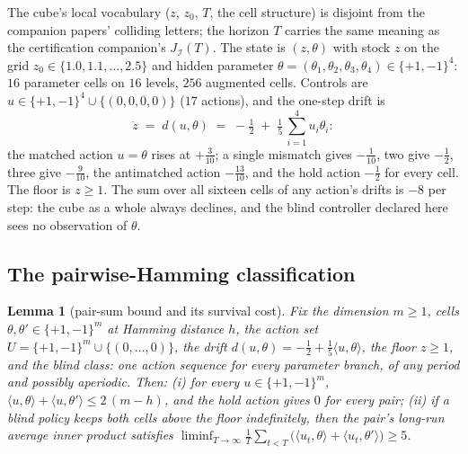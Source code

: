 \documentclass[10pt,twocolumn]{article}
\theoremstyle{plain}
\newtheorem{lemma}[theorem]{Lemma}
\theoremstyle{definition}
\theoremstyle{remark}
\begin{document}
The cube's local vocabulary (\(z\), \(z_{0}\), \(T\), the cell
structure) is disjoint from the companion papers' colliding letters;
the horizon \(T\) carries the same meaning as the certification
companion's \(J_{\mathcal{I}}(T)\). The state is \((z, \theta)\) with stock \(z\) on the grid
\(z_{0} \in \{1.0, 1.1, \dots, 2.5\}\) and hidden parameter
\(\theta = (\theta_{1}, \theta_{2}, \theta_{3}, \theta_{4}) \in
\{+1, -1\}^{4}\): \(16\) parameter cells on \(16\) levels, \(256\)
augmented cells. Controls are \(u \in \{+1,-1\}^{4} \cup \{(0,0,0,0)\}\)
(\(17\) actions), and the one-step drift is
\[
\dot z \;=\; d(u, \theta) \;=\; -\tfrac12
\;+\; \tfrac15\,\textstyle\sum_{i=1}^{4} u_{i}\theta_{i}:
\]
the matched action \(u = \theta\) rises at \(+\tfrac3{10}\); a single
mismatch gives \(-\tfrac1{10}\), two give \(-\tfrac12\), three give
\(-\tfrac9{10}\), the antimatched action \(-\tfrac{13}{10}\), and the
hold action \(-\tfrac12\) for every cell. The floor is \(z \ge 1\).
The sum over all sixteen cells of any action's drifts is \(-8\) per
step: the cube as a whole always declines, and the blind controller
declared here sees no observation of \(\theta\).

\subsection{The pairwise-Hamming classification}\label{scale-hamming}

\begin{lemma}[pair-sum bound and its survival cost]\label{scale-lem:pairsum}
Fix the dimension \(m \ge 1\), cells \(\theta, \theta' \in
\{+1,-1\}^{m}\) at Hamming distance \(h\), the action set
\(U = \{+1,-1\}^{m} \cup \{(0,\dots,0)\}\), the drift
\(d(u, \theta) = -\tfrac12 + \tfrac15\langle u, \theta\rangle\),
the floor \(z \ge 1\), and the blind class: one action sequence for
every parameter branch, of any period and possibly aperiodic. Then:
(i) for every \(u \in \{+1,-1\}^{m}\),
\(\langle u, \theta\rangle + \langle u, \theta'\rangle
\le 2\,(m - h)\), and the hold action gives \(0\) for every pair;
(ii) if a blind policy keeps both cells above the floor indefinitely,
then the pair's long-run average inner product satisfies
\(\liminf_{T \to \infty} \frac1T \sum_{t < T}
\bigl(\langle u_{t}, \theta\rangle + \langle u_{t},
\theta'\rangle\bigr) \ge 5\).
\end{lemma}
\end{document}
